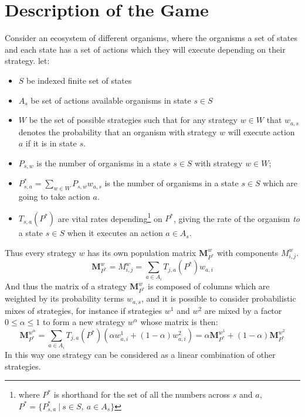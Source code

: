 \section{Description of the Game}\label{section:formalism}

Consider an ecosystem of different organisms, where the organisms a set of states and each state has a set of actions which they will execute depending on their strategy. let:

\begin{itemize}[leftmargin=*,labelsep=4mm]
\item	$S$ be indexed finite set of states
\item   $A_s$ be set of actions available organisms in state $s\in S$
\item   $W$ be the set of possible strategies such that for any strategy $w \in W$ that $w_{a,s}$ denotes the probability that an organism with strategy $w$ will execute action $a$ if it is in state $s$.
\item	$P_{s,w}$ is the number of organisms in a state $s\in S$ with strategy $w\in W$; 
\item   $P^*_{s,a} = \sum_{w\in W}P_{s,w}w_{a,s}$ is the number of organisms in a state $s\in S$ which are going to take action $a$.
\item   $T_{s,a}(P^*)$ are vital rates depending\footnote{where $P^*$ is shorthand for the set of all the numbers across $s$ and $a$,  $P^* = \{P^*_{s,a}~|~s\in S,~a\in A_s\}$} on $P^*$, giving the rate of the organism \textit{to} a state $s\in S$ when it executes an action $a\in A_s$.
\end{itemize}



Thus every strategy $w$ has its own population matrix $\mathbf{M}_{P^*}^w$ with components $M^{w}_{i,j}$.%
\begin{equation}\label{eq:transmission_matrix}\mathbf{M}_{P^*}^w = M^{w}_{i,j} = \sum_{a\in A_i}T_{j,a}(P^*) w_{a,i}\end{equation}
And thus the matrix of a strategy $\mathbf{M}_{P^*}^w$ is composed of columns which are weighted by its probability terms $w_{a,s}$,
and it is possible to consider probabilistic mixes of strategies, for instance if strategies $w^1$ and $w^2$ are mixed by a factor $0\le\alpha\le 1$ to form a new strategy $w^\alpha$ whose matrix is then:
\begin{equation}\label{eq:transmission_matrix2}\mathbf{M}_{P^*}^{w^\alpha} = \sum_{a\in A_i}T_{j,a}(P^*) \left(\alpha w^1_{a,i}+(1-\alpha)w^2_{a,i}\right) = \alpha\mathbf{M}_{P^*}^{w^1} + (1-\alpha)\mathbf{M}_{P^*}^{w^2}\end{equation}
In this way one strategy can be considered as a linear combination of other strategies.
